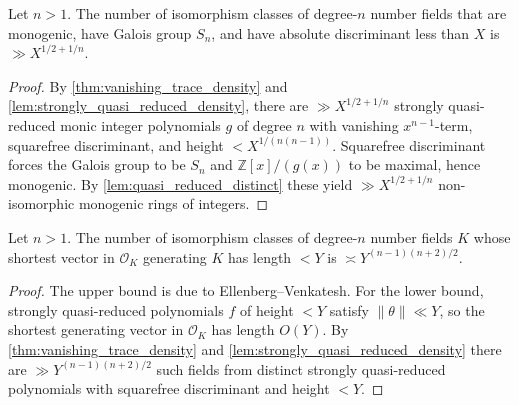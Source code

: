 \begin{corollary}
  \label{cor:monogenic_fields}
  Let \(n>1\).  The number of isomorphism classes of degree-\(n\)
  number fields that are monogenic, have Galois group \(S_n\), and
  have absolute discriminant less than \(X\) is
  \(\gg X^{1/2+1/n}\).
\end{corollary}
\begin{proof}
  By \cref{thm:vanishing_trace_density} and
  \cref{lem:strongly_quasi_reduced_density}, there are
  \(\gg X^{1/2+1/n}\) strongly quasi-reduced monic integer polynomials
  \(g\) of degree \(n\) with vanishing \(x^{n-1}\)-term, squarefree
  discriminant, and height \(<X^{1/(n(n-1))}\).  Squarefree
  discriminant forces the Galois group to be \(S_n\) and
  \(\mathbb{Z}[x]/(g(x))\) to be maximal, hence monogenic.  By
  \cref{lem:quasi_reduced_distinct} these yield
  \(\gg X^{1/2+1/n}\) non-isomorphic monogenic rings of integers.
\end{proof}

\begin{corollary}
  \label{cor:shortest_vector}
  Let \(n>1\).  The number of isomorphism classes of degree-\(n\)
  number fields \(K\) whose shortest vector in \(\mathcal{O}_K\)
  generating \(K\) has length \(<Y\) is
  \(\asymp Y^{(n-1)(n+2)/2}\).
\end{corollary}
\begin{proof}
  The upper bound is due to Ellenberg--Venkatesh.  For the lower bound,
  strongly quasi-reduced polynomials \(f\) of height \(<Y\) satisfy
  \(\|\theta\|\ll Y\), so the shortest generating vector in
  \(\mathcal{O}_K\) has length \(O(Y)\).  By
  \cref{thm:vanishing_trace_density} and
  \cref{lem:strongly_quasi_reduced_density} there are
  \(\gg Y^{(n-1)(n+2)/2}\) such fields from distinct strongly
  quasi-reduced polynomials with squarefree discriminant and height
  \(<Y\).
\end{proof}
